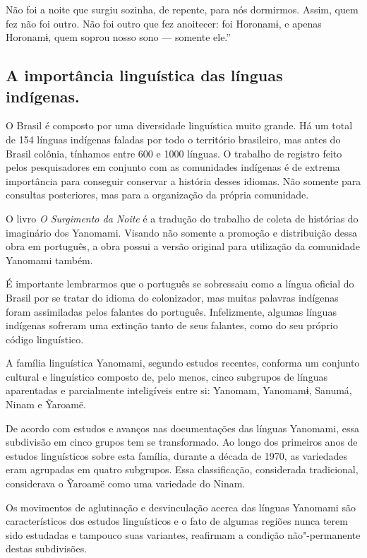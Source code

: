 \documentclass[12pt]{extarticle}
\begin{document}
{Não foi a noite que surgiu sozinha, de repente, para nós dormirmos. Assim, quem fez 
não foi outro. Não foi outro que fez anoitecer: foi Horonamɨ, e apenas Horonamɨ, quem 
soprou nosso sono — somente ele.''


\subsection{A importância linguística das línguas indígenas.}

O Brasil é composto por uma diversidade linguística muito grande. Há um
total de 154 línguas indígenas faladas por todo o território brasileiro,
mas antes do Brasil colônia, tínhamos entre 600 e 1000 línguas. O
trabalho de registro feito pelos pesquisadores em conjunto com as
comunidades indígenas é de extrema importância para conseguir conservar
a história desses idiomas. Não somente para consultas posteriores, mas
para a organização da própria comunidade.

O livro \emph{O Surgimento da Noite} é a tradução do trabalho de coleta
de histórias do imaginário dos Yanomami. Visando não somente a promoção
e distribuição dessa obra em português, a obra possui a versão original
para utilização da comunidade Yanomami também.


É importante lembrarmos que o português se sobressaiu como a língua
oficial do Brasil por se tratar do idioma do colonizador, mas muitas
palavras indígenas foram assimiladas pelos falantes do português.
Infelizmente, algumas línguas indígenas sofreram uma extinção tanto de
seus falantes, como do seu próprio código linguístico.

A família linguística Yanomami, segundo estudos recentes, conforma um 
conjunto cultural e linguístico composto de, pelo menos, cinco subgrupos 
de línguas aparentadas e parcialmente inteligíveis entre si: Yanomam, 
Yanomamɨ, Sanumá, Ninam e Ỹaroamë. 

De acordo com estudos e avanços nas documentações das línguas Yanomami, essa
subdivisão em cinco grupos tem se transformado. Ao longo dos primeiros anos 
de estudos linguísticos sobre esta família, durante a década de 1970, as variedades 
eram agrupadas em quatro subgrupos. Essa classificação, considerada tradicional,
considerava o Ỹaroamë como uma variedade do Ninam. 

Os movimentos de aglutinação e desvinculação acerca das línguas Yanomami são 
característicos dos estudos linguísticos e o fato de algumas regiões nunca terem 
sido estudadas e tampouco suas variantes, reafirmam a condição não"-permanente 
destas subdivisões. 

}
\end{document}
